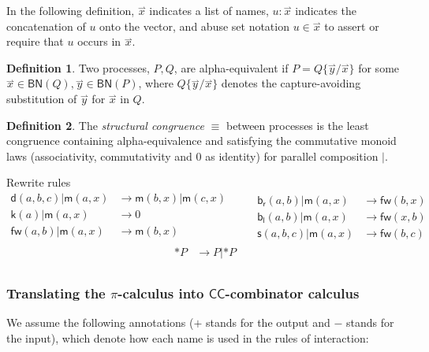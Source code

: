 \documentclass[submission,copyright,creativecommons]{eptcs}
\newcommand{\pic}{$\pi$-calculus}
\newcommand{\ccomb}{$\mathsf{CC}$-combinator calculus}
\newcommand{\pzero}{\mathbin{0}}
\newcommand{\scong}{\mathbin{\equiv}}
\newcommand{\boundnames}[1]{\mathbin{\mathsf{BN}(#1)}}
\newcommand{\red}{\rightarrow}
\newcommand{\vect}[1]{\stackrel{\rightharpoonup}{#1}}
\theoremstyle{definition}
\newtheorem{definition}{Definition}
\theoremstyle{remark}
\theoremstyle{remark}
\begin{document}
In the following definition, $\vect{x}$ indicates a list of names,
$u:\vect{x}$ indicates the concatenation of $u$ onto the vector, and
abuse set notation $u \in \vect{x}$ to assert or require that $u$
occurs in $\vect{x}$.

\begin{definition}
Two processes, $P,Q$, are alpha-equivalent if $P = Q\{\vect{y}/\vect{x}\}$ for
some $\vect{x} \in \boundnames{Q},\vect{y} \in \boundnames{P}$, where $Q\{\vect{y}/\vect{x}\}$
denotes the capture-avoiding substitution of $\vect{y}$ for $\vect{x}$ in $Q$.
\end{definition}

\begin{definition}
  The {\em structural congruence} $\equiv$
  between processes \cite{SangiorgiWalker} is the least congruence containing
  alpha-equivalence and satisfying the commutative monoid laws
  (associativity, commutativity and $\pzero$ as identity) for parallel
  composition $|$.
\end{definition}

Rewrite rules
\[\begin{array}{rl}
  \mathsf{d}(a,b,c) | \mathsf{m}(a,x) & \red \mathsf{m}(b,x) | \mathsf{m}(c,x) \\
  \mathsf{k}(a) | \mathsf{m}(a,x) & \red 0 \\
  \mathsf{fw}(a,b) | \mathsf{m}(a,x) & \red \mathsf{m}(b,x) \\
\end{array} \quad \quad
\begin{array}{rl}
  \mathsf{b}_{\mathsf{r}}(a,b) | \mathsf{m}(a,x) & \red \mathsf{fw}(b,x) \\
  \mathsf{b}_{\mathsf{l}}(a,b) | \mathsf{m}(a,x) & \red \mathsf{fw}(x,b) \\
  \mathsf{s}(a,b,c) | \mathsf{m}(a,x) & \red \mathsf{fw}(b,c)
\end{array}\]
\[\begin{array}{rl}
  \mathsf{*}P & \red P|\mathsf{*}P \\
\end{array}\]

\subsubsection{Translating the {\pic} into {\ccomb}}
We assume the following annotations ($+$ stands for the output and $-$
stands for the input), which denote how each name is used in the rules
of interaction:
\end{document}
